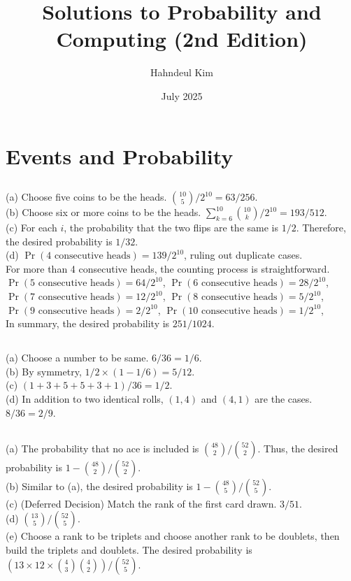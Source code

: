 \documentclass{article}
\title {\myfont Solutions to Probability and Computing (2nd Edition)}
\author{Hahndeul Kim}
\date{July 2025}
\begin{document}
\begin{titlingpage}
\maketitle
\end{titlingpage}
\newpage
\section{Events and Probability}
\subsection{}
(a) Choose five coins to be the heads. $\binom{10}{5} / {2^{10}} = 63/256$.\\
(b) Choose six or more coins to be the heads. $\sum\limits_{k=6}^{10}\binom{10}{k} / {2^{10}} = 193/512$.\\
(c) For each $\textit{i}$, the probability that the two flips are the same is $1/2$. Therefore, the desired probability is $1/32$.\\
(d) $\Pr(\text{4 consecutive heads})=139/2^{10}$, ruling out duplicate cases.\\
For more than 4 consecutive heads, the counting process is straightforward.\\
$\Pr(\text{5 consecutive heads})=64/2^{10}$,
$\Pr(\text{6 consecutive heads})=28/2^{10}$,\\
$\Pr(\text{7 consecutive heads})=12/2^{10}$,
$\Pr(\text{8 consecutive heads})=5/2^{10}$,\\
$\Pr(\text{9 consecutive heads})=2/2^{10}$,
$\Pr(\text{10 consecutive heads})=1/2^{10}$,\\
In summary, the desired probability is $251/1024$.
\subsection{}
(a) Choose a number to be same. $6/36 = 1/6$.\\
(b) By symmetry, $1/2 \times(1-1/6) = 5/12$.\\
(c) $(1+3+5+5+3+1)/36=1/2$.\\
(d) In addition to two identical rolls, $(1,4)$ and $(4,1)$ are the cases. $8/36 = 2/9$.
\subsection{}
(a) The probability that no ace is included is $\binom{48}{2}/\binom{52}{2}$. Thus, the desired probability is $1-\binom{48}{2}/\binom{52}{2}$.\\
(b) Similar to (a), the desired probability is $1-\binom{48}{5}/\binom{52}{5}$.\\
(c) (Deferred Decision) Match the rank of the first card drawn. $3/51$.\\
(d) $\binom{13}{5}/\binom{52}{5}$.\\
(e) Choose a rank to be triplets and choose another rank to be doublets, then build the triplets and doublets. The desired probability is $(13\times12\times\binom{4}{3}\binom{4}{2})/\binom{52}{5}$.
\end{document}
